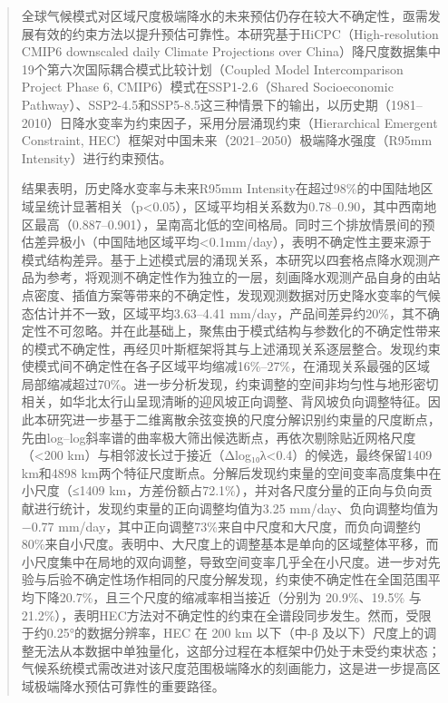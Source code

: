 \documentclass[draft]{agujournal2019}
\begin{document}
\begin{abstract}
全球气候模式对区域尺度极端降水的未来预估仍存在较大不确定性，亟需发展有效的约束方法以提升预估可靠性。本研究基于HiCPC（High-resolution CMIP6 downscaled daily Climate Projections over China）降尺度数据集中19个第六次国际耦合模式比较计划（Coupled Model Intercomparison Project Phase 6, CMIP6）模式在SSP1-2.6（Shared Socioeconomic Pathway）、SSP2-4.5和SSP5-8.5这三种情景下的输出，以历史期（1981--2010）日降水变率为约束因子，采用分层涌现约束（Hierarchical Emergent Constraint, HEC）框架对中国未来（2021--2050）极端降水强度（R95mm Intensity）进行约束预估。

结果表明，历史降水变率与未来R95mm Intensity在超过98\%的中国陆地区域呈统计显著相关（p\textless0.05），区域平均相关系数为0.78--0.90，其中西南地区最高（0.887--0.901），呈南高北低的空间格局。同时三个排放情景间的预估差异极小（中国陆地区域平均\textless0.1mm/day），表明不确定性主要来源于模式结构差异。基于上述模式层的涌现关系，本研究以四套格点降水观测产品为参考，将观测不确定性作为独立的一层，刻画降水观测产品自身的由站点密度、插值方案等带来的不确定性，发现观测数据对历史降水变率的气候态估计并不一致，区域平均3.63--4.41 mm/day，产品间差异约20\%，其不确定性不可忽略。并在此基础上，聚焦由于模式结构与参数化的不确定性带来的模式不确定性，再经贝叶斯框架将其与上述涌现关系逐层整合。发现约束使模式间不确定性在各子区域平均缩减16\%--27\%，在涌现关系最强的区域局部缩减超过70\%。进一步分析发现，约束调整的空间非均匀性与地形密切相关，如华北太行山呈现清晰的迎风坡正向调整、背风坡负向调整特征。因此本研究进一步基于二维离散余弦变换的尺度分解识别约束量的尺度断点，先由log--log斜率谱的曲率极大筛出候选断点，再依次剔除贴近网格尺度（\textless200 km）与相邻波长过于接近（Δlog₁₀λ\textless0.4）的候选，最终保留1409 km和4898 km两个特征尺度断点。分解后发现约束量的空间变率高度集中在小尺度（≤1409 km，方差份额占72.1\%），并对各尺度分量的正向与负向贡献进行统计，发现约束量的正向调整均值为3.25 mm/day、负向调整均值为 −0.77 mm/day，其中正向调整73\%来自中尺度和大尺度，而负向调整约80\%来自小尺度。表明中、大尺度上的调整基本是单向的区域整体平移，而小尺度集中在局地的双向调整，导致空间变率几乎全在小尺度。进一步对先验与后验不确定性场作相同的尺度分解发现，约束使不确定性在全国范围平均下降20.7\%，且三个尺度的缩减率相当接近（分别为 20.9\%、19.5\% 与 21.2\%），表明HEC方法对不确定性的约束在全谱段同步发生。然而，受限于约0.25°的数据分辨率，HEC 在 200 km 以下（中-β 及以下）尺度上的调整无法从本数据中单独量化，这部分过程在本框架中仍处于未受约束状态；气候系统模式需改进对该尺度范围极端降水的刻画能力，这是进一步提高区域极端降水预估可靠性的重要路径。
\end{abstract}
\end{document}
